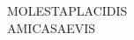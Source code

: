 \documentclass{article}
\begin{document}
\begin{center}
	{\pietra\color{bloodred}\fontsize{28}{34}\selectfont
		MOLESTA\hspace{3em}PLACIDIS\\[2.5em]
		AMICA\hspace{3.6em}SAEVIS}
\end{center}
\end{document}

